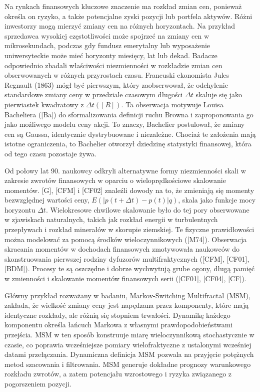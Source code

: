 \documentclass[12pt]{article}
\theoremstyle{definition}
\begin{document}
Na rynkach finansowych kluczowe znaczenie ma rozkład zmian cen, ponieważ określa on ryzyko, a także potencjalne zyski pozycji lub portfela aktywów. Różni inwestorzy mogą mierzyć zmiany cen na różnych horyzontach. Na przykład sprzedawca wysokiej częstotliwości może spojrzeć na zmiany cen w mikrosekundach, podczas gdy fundusz emerytalny lub wyposażenie uniwersyteckie może mieć horyzonty miesięcy, lat lub dekad. Badacze odpowiednio zbadali właściwości niezmienności w rozkładzie zmian cen obserwowanych w różnych przyrostach czasu. Francuski ekonomista Jules Regnault (1863) mógł być pierwszym, który zaobserwował, że odchylenie standardowe zmiany ceny w przedziale czasowym długości $\Delta t$ skaluje się jako pierwiastek kwadratowy z $\Delta t ([R])$. Ta obserwacja motywuje Louisa Bacheliera ([Ba]) do sformalizowania definicji ruchu Browna i zaproponowania go jako możliwego modelu ceny akcji. To znaczy, Bachelier postulował, że zmiany cen są Gaussa, identycznie dystrybuowane i niezależne. Chociaż te założenia mają istotne ograniczenia, to Bachelier otworzył dziedzinę statystyki finansowej, która od tego czasu pozostaje żywa.


Od połowy lat 90. naukowcy odkryli alternatywne formy niezmienności skali w zakresie zwrotów finansowych w oparciu o wieloprędkościowe skalowanie momentów. [G], [CFM] i [CF02] znaleźli dowody na to, że zmieniają się momenty bezwzględnej wartości ceny, $E(| p (t + \Delta t) - p (t) | q)$, skala jako funkcje mocy horyzontu $\Delta t$. Wielokresowe chwilowe skalowanie było do tej pory obserwowane w zjawiskach naturalnych, takich jak rozkład energii w turbulentnych przepływach i rozkład minerałów w skorupie ziemskiej. Te fizyczne prawidłowości można modelować za pomocą środków wieloczynnikowych ([M74]). Obserwacja skracania momentów w dochodach finansowych zmotywowała naukowców do skonstruowania pierwszej rodziny dyfuzorów multifraktycznych ([CFM], [CF01], [BDM]). Procesy te są oszczędne i dobrze wychwytują grube ogony, długą pamięć w zmienności i skalowanie momentów finansowych serii ([CF01], [CF04], [CF]).

Główny przykład rozważany w badaniu, Markov-Switching Multifractal (MSM), zakłada, że wielkość zmiany ceny jest napędzana przez komponenty, które mają identyczne rozkłady, ale różnią się stopniem trwałości. Dynamikę każdego komponentu określa łańcuch Markowa z własnymi prawdopodobieństwami przejścia. MSM w ten sposób konstruuje miarę wieloczynnikową stochastycznie w czasie, co poprawia wcześniejsze pomiary wielofraktyczne z ustalonymi wcześniej datami przełączania. Dynamiczna definicja MSM pozwala na przyjęcie potężnych metod szacowania i filtrowania. MSM generuje dokładne prognozy warunkowego rozkładu zwrotów, a zatem potencjału wzrostowego i ryzyka związanego z pogorszeniem pozycji.
\end{document}
